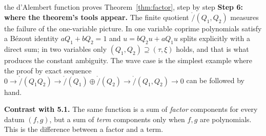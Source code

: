 \begin{explained}{the d'Alembert function proves Theorem~\ref{thm:factor}, step by step}
\medskip\textbf{Step 6: where the theorem's tools appear.} The finite quotient $\ring/(Q_1,Q_2)$ measures the failure of the one-variable picture. In one variable coprime polynomials satisfy a B\'ezout identity $aQ_1+bQ_2=1$ and $u=bQ_2u+aQ_1u$ splits explicitly with a direct sum; in two variables only $(Q_1,Q_2)\supseteq(\tau,\xi)$ holds, and that is what produces the constant ambiguity. The wave case is the simplest example where the proof by exact sequence $0\to\ring/(Q_1Q_2)\to\ring/(Q_1)\oplus\ring/(Q_2)\to\ring/(Q_1,Q_2)\to0$ can be followed by hand.

\medskip\textbf{Contrast with 5.1.} The same function is a sum of \emph{factor} components for every datum $(f,g)$, but a sum of \emph{term} components only when $f,g$ are polynomials. This is the difference between a factor and a term.
\end{explained}

